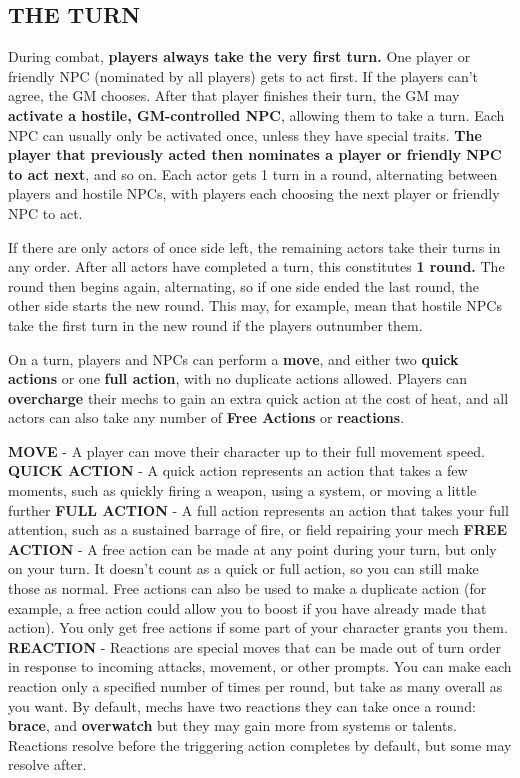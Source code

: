 \subsection{THE TURN}
During combat, \textbf{players always take the very first turn.} One player or friendly NPC (nominated by all players) gets to act first. If the players can’t agree, the GM chooses. After that player finishes their turn, the GM may \textbf{activate a hostile, GM-controlled NPC}, allowing them to take a turn. Each NPC can usually only be activated once, unless they have special traits. \textbf{The player that previously acted then nominates a player or friendly NPC to act next}, and so on. Each actor gets 1 turn in a round, alternating between players and hostile NPCs, with players each choosing the next player or friendly NPC to act.

If there are only actors of once side left, the remaining actors take their turns in any order. After all actors have completed a turn, this constitutes \textbf{1 round.} The round then begins again, alternating, so if one side ended the last round, the other side starts the new round. This may, for example, mean that hostile NPCs take the first turn in the new round if the players outnumber them.

On a turn, players and NPCs can perform a \textbf{move}, and either two \textbf{quick actions} or one \textbf{full action}, with no duplicate actions allowed. Players can \textbf{overcharge} their mechs to gain an extra quick action at the cost of heat, and all actors can also take any number of \textbf{Free Actions} or \textbf{reactions}.

\textbf{MOVE} - A player can move their character up to their full movement speed.
\textbf{QUICK ACTION} - A quick action represents an action that takes a few moments, such as quickly firing a weapon, using a system, or moving a little further
\textbf{FULL ACTION} - A full action represents an action that takes your full attention, such as a sustained barrage of fire, or field repairing your mech
\textbf{FREE ACTION} - A free action can be made at any point during your turn, but only on your turn. It doesn’t count as a quick or full action, so you can still make those as normal. Free actions can also be used to make a duplicate action (for example, a free action could allow you to boost if you have already made that action). You only get free actions if some part of your character grants you them.
\textbf{REACTION} - Reactions are special moves that can be made out of turn order in response to incoming attacks, movement, or other prompts. You can make each reaction only a specified number of times per round, but take as many overall as you want. By default, mechs have two reactions they can take once a round: \textbf{brace}, and \textbf{overwatch} but they may gain more from systems or talents. Reactions resolve before the triggering action completes by default, but some may resolve after.

